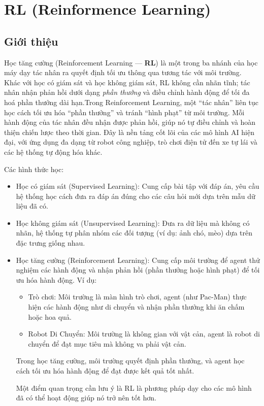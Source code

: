 \documentclass[final,letterpaper,twoside,12pt]{report}
\begin{document}
\part{RL (Reinformence Learning)}
\setcounter{chapter}{0}

	\chapter{Giới thiệu}

		Học tăng cường (Reinforcement Learning — \textbf{RL}) là một trong ba nhánh của học máy dạy tác nhân ra quyết định tối ưu thông qua tương tác với môi trường. Khác với học có giám sát và học không giám sát, RL không cần nhãn tĩnh; tác nhân nhận phản hồi dưới dạng \emph{phần thưởng} và điều chỉnh hành động để tối đa hoá phần thưởng dài hạn.Trong Reinforcement Learning, một “tác nhân” liên tục học cách tối ưu hóa “phần thưởng” và tránh “hình phạt” từ môi trường. Mỗi hành động của tác nhân đều nhận được phản hồi, giúp nó tự điều chỉnh và hoàn thiện chiến lược theo thời gian. Đây là nền tảng cốt lõi của các mô hình AI hiện đại, với ứng dụng đa dạng từ robot công nghiệp, trò chơi điện tử đến xe tự lái và các hệ thống tự động hóa khác.

		Các hình thức học:

			\begin{itemize}
				
			\item Học có giám sát (Supervised Learning): Cung cấp bài tập với đáp án, yêu cầu hệ thống học cách đưa ra đáp án đúng cho các câu hỏi mới dựa trên mẫu dữ liệu đã có.

			\item Học không giám sát (Unsupervised Learning): Đưa ra dữ liệu mà không có nhãn, hệ thống tự phân nhóm các đối tượng (ví dụ: ảnh chó, mèo) dựa trên đặc trưng giống nhau.

			\item Học tăng cường (Reinforcement Learning): Cung cấp môi trường để agent thử nghiệm các hành động và nhận phản hồi (phần thưởng hoặc hình phạt) để tối ưu hóa hành động. Ví dụ:

				\begin{itemize}

					\item Trò chơi: Môi trường là màn hình trò chơi, agent (như Pac-Man) thực hiện các hành động như di chuyển và nhận phần thưởng khi ăn chấm hoặc hoa quả.
			
					\item Robot Di Chuyển: Môi trường là không gian với vật cản, agent là robot di chuyển để đạt mục tiêu mà không va phải vật cản.
					
				\end{itemize}
			Trong học tăng cường, môi trường quyết định phần thưởng, và agent học cách tối ưu hóa hành động để đạt được kết quả tốt nhất.

			Một điểm quan trọng cần lưu ý là RL là phương pháp dạy cho các mô hình đã có thể hoạt động giúp nó trở nên tốt hơn.
			\end{itemize}
\end{document}
